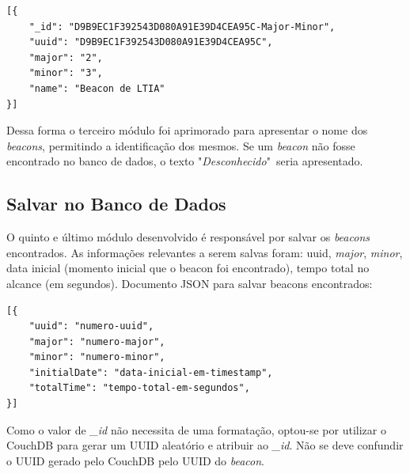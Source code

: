 \begin{verbatim}
[{
    "_id": "D9B9EC1F392543D080A91E39D4CEA95C-Major-Minor",
    "uuid": "D9B9EC1F392543D080A91E39D4CEA95C",
    "major": "2",
    "minor": "3",
    "name": "Beacon de LTIA"
}]
\end{verbatim}

Dessa forma o terceiro módulo foi aprimorado para apresentar o nome dos \textit{beacons}, permitindo a identificação dos mesmos. Se um \textit{beacon} não fosse encontrado no banco de dados, o texto "\textit{Desconhecido}"\ seria apresentado.

\subsection{Salvar no Banco de Dados}\label{sec:quinto-modulo}

O quinto e último módulo desenvolvido é responsável por salvar os \textit{beacons} encontrados. As informações relevantes a serem salvas foram: uuid, \textit{major}, \textit{minor}, data inicial (momento inicial que o beacon foi encontrado), tempo total no alcance (em segundos). Documento JSON para salvar beacons encontrados:

\begin{verbatim}
[{
    "uuid": "numero-uuid",
    "major": "numero-major",
    "minor": "numero-minor",
    "initialDate": "data-inicial-em-timestamp",
    "totalTime": "tempo-total-em-segundos",
}]
\end{verbatim}

Como o valor de \textit{\_id} não necessita de uma formatação, optou-se por utilizar o CouchDB para gerar um UUID aleatório e atribuir ao \textit{\_id}. Não se deve confundir o UUID gerado pelo CouchDB pelo UUID do \textit{beacon}.

